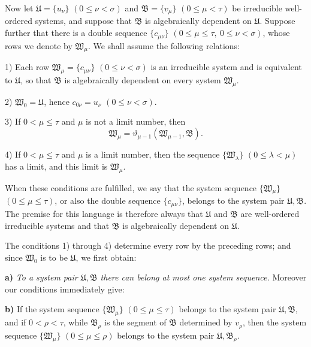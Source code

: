 Now let \(\mathfrak U=\{u_\nu\}\) \((0\leq\nu<\sigma)\) and \(\mathfrak B=\{v_\mu\}\) \((0\leq\mu<\tau)\) be irreducible well-ordered systems, and suppose that \(\mathfrak B\) is algebraically dependent on \(\mathfrak U\). Suppose further that there is a double sequence \(\{c_{\mu\nu}\}\) \((0\leq\mu\leq\tau,\ 0\leq\nu<\sigma)\), whose rows we denote by \(\mathfrak W_\mu\). We shall assume the following relations:

1) Each row \(\mathfrak W_\mu=\{c_{\mu\nu}\}\) \((0\leq\nu<\sigma)\) is an irreducible system and is equivalent to \(\mathfrak U\), so that \(\mathfrak B\) is algebraically dependent on every system \(\mathfrak W_\mu\).

2) \(\mathfrak W_0=\mathfrak U\), hence \(c_{0\nu}=u_\nu\) \((0\leq\nu<\sigma)\).

3) If \(0<\mu\leq\tau\) and \(\mu\) is not a limit number, then
\[
\mathfrak W_\mu=\vartheta_{\mu-1}(\mathfrak W_{\mu-1},\mathfrak B).
\]

4) If \(0<\mu\leq\tau\) and \(\mu\) is a limit number, then the sequence \(\{\mathfrak W_\lambda\}\) \((0\leq\lambda<\mu)\) has a limit, and this limit is \(\mathfrak W_\mu\).

When these conditions are fulfilled, we say that the system sequence \(\{\mathfrak W_\mu\}\) \((0\leq\mu\leq\tau)\), or also the double sequence \(\{c_{\mu\nu}\}\), belongs to the system pair \(\mathfrak U,\mathfrak B\). The premise for this language is therefore always that \(\mathfrak U\) and \(\mathfrak B\) are well-ordered irreducible systems and that \(\mathfrak B\) is algebraically dependent on \(\mathfrak U\).

The conditions 1) through 4) determine every row by the preceding rows; and since \(\mathfrak W_0\) is to be \(\mathfrak U\), we first obtain:

\textbf{a)} \emph{To a system pair \(\mathfrak U,\mathfrak B\) there can belong at most one system sequence.} Moreover our conditions immediately give:

\textbf{b)} If the system sequence \(\{\mathfrak W_\mu\}\) \((0\leq\mu\leq\tau)\) belongs to the system pair \(\mathfrak U,\mathfrak B\), and if \(0<\rho<\tau\), while \(\mathfrak B_\rho\) is the segment of \(\mathfrak B\) determined by \(v_\rho\), then the system sequence \(\{\mathfrak W_\mu\}\) \((0\leq\mu\leq\rho)\) belongs to the system pair \(\mathfrak U,\mathfrak B_\rho\).

